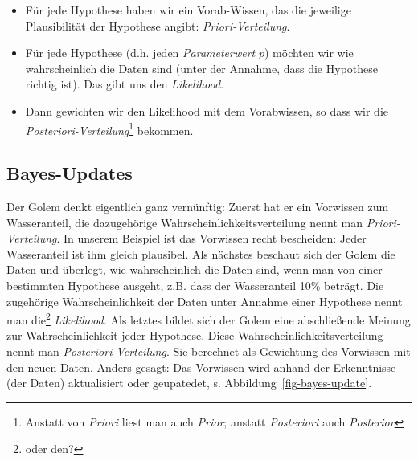 \documentclass[
  a4paper,
  DIV=11]{scrreprt}
\theoremstyle{definition}
\theoremstyle{remark}
\begin{document}
\begin{itemize}
\item
  Für jede Hypothese haben wir ein Vorab-Wissen, das die jeweilige
  Plausibilität der Hypothese angibt: \emph{Priori-Verteilung}.
\item
  Für jede Hypothese (d.h. jeden \emph{Parameterwert} \(p\)) möchten wir
  wie wahrscheinlich die Daten sind (unter der Annahme, dass die
  Hypothese richtig ist). Das gibt uns den \emph{Likelihood}.
\item
  Dann gewichten wir den Likelihood mit dem Vorabwissen, so dass wir die
  \emph{Posteriori-Verteilung}\footnote{ Anstatt von \emph{Priori} liest
    man auch \emph{Prior}; anstatt \emph{Posteriori} auch
    \emph{Posterior}} bekommen.
\end{itemize}

\hypertarget{bayes-updates}{%
\subsection{Bayes-Updates}\label{bayes-updates}}

Der Golem denkt eigentlich ganz vernünftig: Zuerst hat er ein Vorwissen
zum Wasseranteil, die dazugehörige Wahrscheinlichkeitsverteilung nennt
man \emph{Priori-Verteilung}. In unserem Beispiel ist das Vorwissen
recht bescheiden: Jeder Wasseranteil ist ihm gleich plausibel. Als
nächstes beschaut sich der Golem die Daten und überlegt, wie
wahrscheinlich die Daten sind, wenn man von einer bestimmten Hypothese
ausgeht, z.B. dass der Wasseranteil 10\% beträgt. Die zugehörige
Wahrscheinlichkeit der Daten unter Annahme einer Hypothese nennt man
die\footnote{oder den?} \emph{Likelihood.} Als letztes bildet sich der
Golem eine abschließende Meinung zur Wahrscheinlichkeit jeder Hypothese.
Diese Wahrscheinlichkeitsverteilung nennt man
\emph{Posteriori-Verteilung}. Sie berechnet als Gewichtung des Vorwissen
mit den neuen Daten. Anders gesagt: Das Vorwissen wird anhand der
Erkenntnisse (der Daten) aktualisiert oder geupatedet, s.
Abbildung~\ref{fig-bayes-update}.
\end{document}
